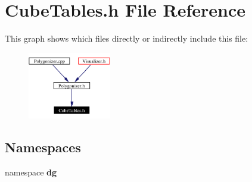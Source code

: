 \section{Cube\-Tables.h File Reference}
\label{CubeTables_8h}


This graph shows which files directly or indirectly include this file:\begin{figure}[H]
\begin{center}
\leavevmode
\includegraphics[width=103pt]{CubeTables_8h__dep__incl}
\end{center}
\end{figure}
\subsection*{Namespaces}
\begin{CompactItemize}
\item 
namespace {\bf dg}
\end{CompactItemize}
